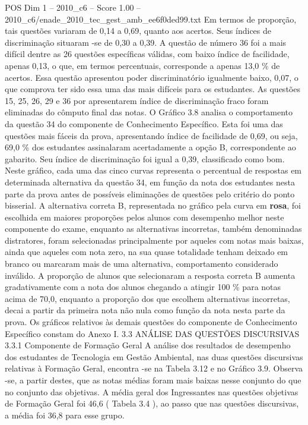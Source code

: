 \begin{textsample}{POS Dim 1 – 2010\_c6 – Score 1.00 – 2010\_c6/enade\_2010\_tec\_gest\_amb\_ee6f0ded99.txt}
Em termos de proporção, tais questões variaram de 0,14 a 0,69, quanto aos acertos.
Seus índices de discriminação situaram -se de 0,30 a 0,39.
A questão de número 36 foi a mais difícil dentre as 26 questões específicas válidas, com baixo índice de facilidade, apenas 0,13, o que, em termos percentuais, corresponde a apenas 13,0 \% de acertos.
Essa questão apresentou poder discriminatório igualmente baixo, 0,07, o que comprova ter sido essa uma das mais difíceis para os estudantes.
As questões 15, 25, 26, 29 e 36 por apresentarem índice de discriminação fraco foram eliminadas do cômputo final das notas.
O Gráfico 3.8 analisa o comportamento da questão 34 do componente de Conhecimento Específico.
Esta foi uma das questões mais fáceis da prova, apresentando índice de facilidade de 0,69, ou seja, 69,0 \% dos estudantes assinalaram acertadamente a opção B, correspondente ao gabarito.
Seu índice de discriminação foi igual a 0,39, classificado como bom.
Neste gráfico, cada uma das cinco curvas representa o percentual de respostas em determinada alternativa da questão 34, em função da nota dos estudantes nesta parte da prova antes de possíveis eliminações de questões pelo critério do ponto bisserial.
A alternativa correta B, representada no gráfico pela curva em \textbf{rosa}, foi escolhida em maiores proporções pelos alunos com desempenho melhor neste componente do exame, enquanto as alternativas incorretas, também denominadas distratores, foram selecionadas principalmente por aqueles com notas mais baixas, ainda que aqueles com nota zero, na sua quase totalidade tenham deixado em branco ou marcaram mais de uma alternativa, comportamento considerado inválido.
A proporção de alunos que selecionaram a resposta correta B aumenta gradativamente com a nota dos alunos chegando a atingir 100 \% para notas acima de 70,0, enquanto a proporção dos que escolhem alternativas incorretas, decai a partir da primeira nota não nula como função da nota nesta parte da prova.
Os gráficos relativos às demais questões do componente de Conhecimento Específico constam do Anexo I. 3.3 ANÁLISE DAS QUESTÕES DISCURSIVAS 3.3.1 Componente de Formação Geral A análise dos resultados de desempenho dos estudantes de Tecnologia em Gestão Ambiental, nas duas questões discursivas relativas à Formação Geral, encontra -se na Tabela 3.12 e no Gráfico 3.9.
Observa -se, a partir destes, que as notas médias foram mais baixas nesse conjunto do que no conjunto das objetivas.
A média geral dos Ingressantes nas questões objetivas de Formação Geral foi 46,6 ( Tabela 3.4 ), ao passo que nas questões discursivas, a média foi 36,8 para esse grupo.

\end{textsample}

